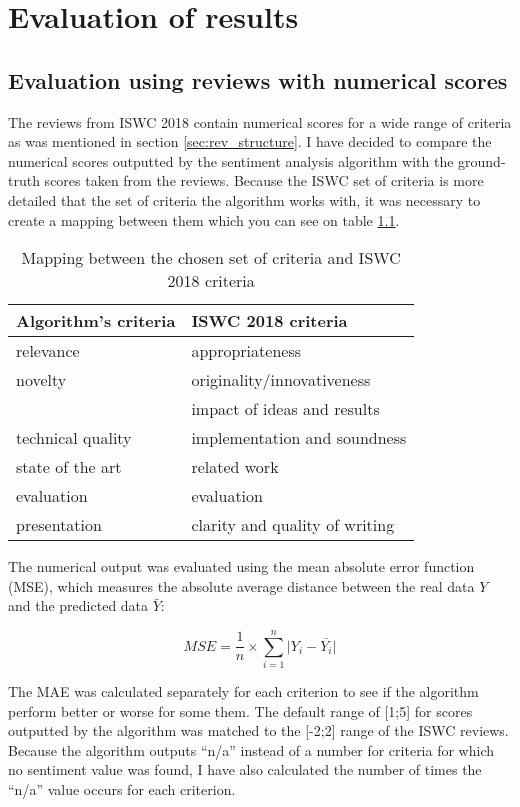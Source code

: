 \chapter{Evaluation of results}

\section{Evaluation using reviews with numerical scores}
The reviews from ISWC 2018 contain numerical scores for a wide range of criteria as was mentioned in section \ref{sec:rev_structure}. I have decided to compare the numerical scores outputted by the sentiment analysis algorithm with the ground-truth scores taken from the reviews. Because the ISWC set of criteria is more detailed that the set of criteria the algorithm works with, it was necessary to create a mapping between them which you can see on table \ref{tab:mapping_numerical}. 

\begin{table}[!htb]
\caption{Mapping between the chosen set of criteria and ISWC 2018 criteria}
\centering
\label{tab:mapping_numerical}
\begin{tabular}{ll}
\textbf{Algorithm's criteria} & \textbf{ISWC 2018 criteria}    \\ \hline
relevance                     & appropriateness                \\
novelty                       & originality/innovativeness     \\
                              & impact of ideas and results    \\
technical quality             & implementation and soundness   \\
state of the art              & related work                   \\
evaluation                    & evaluation                     \\
presentation                  & clarity and quality of writing
\end{tabular}
\end{table}

The numerical output was evaluated using the mean absolute error function (MSE), which measures the absolute average distance between the real data $Y$ and the predicted data $\bar{Y}$:

$$MSE = \frac{1}{n} \times \sum_{i=1}^{n} \lvert Y_{i} - \bar{Y_{i}} \rvert$$

The MAE was calculated separately for each criterion to see if the algorithm perform better or worse for some them. The default range of [1;5] for scores outputted by the algorithm was matched to the [-2;2] range of the ISWC reviews. Because the algorithm outputs ``n/a'' instead of a number for criteria for which no sentiment value was found, I have also calculated the number of times the ``n/a'' value occurs for each criterion.

